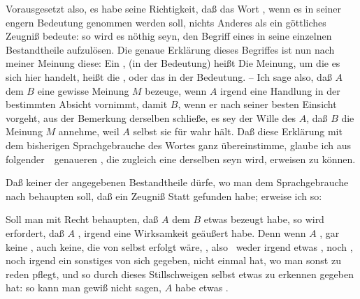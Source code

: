 \begin{aufza}
\item Vorausgesetzt also, es habe seine Richtigkeit, daß das Wort , wenn es in seiner engern Bedeutung genommen werden soll, nichts Anderes als ein göttliches Zeugniß bedeute: so wird es nöthig seyn, den Begriff eines  in seine einzelnen Bestandtheile aufzulösen. Die genaue Erklärung dieses Begriffes ist nun nach meiner Meinung diese: Ein , (in der  Bedeutung) heißt  Die Meinung, um die es sich hier handelt, heißt die , oder das  in der  Bedeutung. -- Ich sage also, daß $A$ dem $B$ eine gewisse Meinung $M$ bezeuge, wenn $A$ irgend eine Handlung in der bestimmten Absicht vornimmt, damit $B$, wenn er nach seiner besten Einsicht vorgeht, aus der Bemerkung derselben schließe, es sey der Wille des $A$, daß $B$ die Meinung $M$ annehme, weil $A$ selbst sie für wahr hält. Daß diese Erklärung mit dem bisherigen Sprachgebrauche des Wortes  ganz übereinstimme, glaube ich aus folgender~\ genaueren , die zugleich eine  derselben seyn wird, erweisen zu können.
\begin{aufzb} 
\item Daß  keiner der angegebenen Bestandtheile  dürfe, wo man dem Sprachgebrauche nach behaupten soll, daß ein Zeugniß Statt gefunden habe; erweise ich so:
\begin{aufzc}
\item Soll man mit Recht behaupten, daß $A$ dem $B$ etwas bezeugt habe, so wird  erfordert, daß $A$ , irgend eine Wirksamkeit geäußert habe. Denn wenn $A$ , gar keine , auch keine, die von selbst erfolgt wäre, , also \zB\ weder irgend etwas , noch , noch irgend ein sonstiges  von sich gegeben, nicht einmal  hat, wo man sonst zu reden pflegt, und so durch dieses Stillschweigen selbst etwas zu erkennen gegeben hat: so kann man gewiß nicht sagen, $A$ habe etwas .

\end{aufzc}
\end{aufzb}
\end{aufza}
